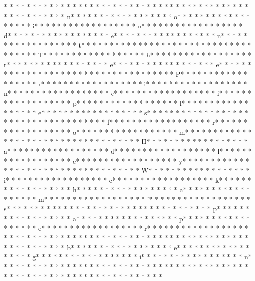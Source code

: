 * * *  * * *  * * *  *  * * *  *  * * *  * 	* * *  * * *  * * *  *  * * *  *  * * *  * 	* * *  * * *  * * *  *  * * *  *  * * *  * n* * *  * * *  * * *  *  * * *  *  * * *  * o* * *  * * *  * * *  *  * * *  *  * * *  * i* * *  * * *  * * *  *  * * *  *  * * *  * n* * *  * * *  * * *  *  * * *  *  * * *  * d* * *  * * *  * * *  *  * * *  *  * * *  * e* * *  * * *  * * *  *  * * *  *  * * *  * n* * *  * * *  * * *  *  * * *  *  * * *  * t* * *  * * *  * * *  *  * * *  *  * * *  *  * * *  * * *  * * *  *  * * *  *  * * *  * T* * *  * * *  * * *  *  * * *  *  * * *  * h* * *  * * *  * * *  *  * * *  *  * * *  * r* * *  * * *  * * *  *  * * *  *  * * *  * e* * *  * * *  * * *  *  * * *  *  * * *  * e* * *  * * *  * * *  *  * * *  *  * * *  *  * * *  * * *  * * *  *  * * *  *  * * *  * P* * *  * * *  * * *  *  * * *  *  * * *  * r* * *  * * *  * * *  *  * * *  *  * * *  * i* * *  * * *  * * *  *  * * *  *  * * *  * n* * *  * * *  * * *  *  * * *  *  * * *  * c* * *  * * *  * * *  *  * * *  *  * * *  * i* * *  * * *  * * *  *  * * *  *  * * *  * p* * *  * * *  * * *  *  * * *  *  * * *  * l* * *  * * *  * * *  *  * * *  *  * * *  * e* * *  * * *  * * *  *  * * *  *  * * *  * s* * *  * * *  * * *  *  * * *  *  * * *  *  * * *  * * *  * * *  *  * * *  *  * * *  * f* * *  * * *  * * *  *  * * *  *  * * *  * r* * *  * * *  * * *  *  * * *  *  * * *  * o* * *  * * *  * * *  *  * * *  *  * * *  * m* * *  * * *  * * *  *  * * *  *  * * *  *  * * *  * * *  * * *  *  * * *  *  * * *  * H* * *  * * *  * * *  *  * * *  *  * * *  * a* * *  * * *  * * *  *  * * *  *  * * *  * d* * *  * * *  * * *  *  * * *  *  * * *  * l* * *  * * *  * * *  *  * * *  *  * * *  * e* * *  * * *  * * *  *  * * *  *  * * *  * y* * *  * * *  * * *  *  * * *  *  * * *  *  * * *  * * *  * * *  *  * * *  *  * * *  * W* * *  * * *  * * *  *  * * *  *  * * *  * i* * *  * * *  * * *  *  * * *  *  * * *  * c* * *  * * *  * * *  *  * * *  *  * * *  * k* * *  * * *  * * *  *  * * *  *  * * *  * h* * *  * * *  * * *  *  * * *  *  * * *  * a* * *  * * *  * * *  *  * * *  *  * * *  * m* * *  * * *  * * *  *  * * *  *  * * *  * '* * *  * * *  * * *  *  * * *  *  * * *  * s* * *  * * *  * * *  *  * * *  *  * * *  *  * * *  * * *  * * *  *  * * *  *  * * *  * p* * *  * * *  * * *  *  * * *  *  * * *  * a* * *  * * *  * * *  *  * * *  *  * * *  * p* * *  * * *  * * *  *  * * *  *  * * *  * e* * *  * * *  * * *  *  * * *  *  * * *  * r* * *  * * *  * * *  *  * * *  *  * * *  * 
* * *  * * *  * * *  *  * * *  *  * * *  * 	* * *  * * *  * * *  *  * * *  *  * * *  * 	* * *  * * *  * * *  *  * * *  *  * * *  * b* * *  * * *  * * *  *  * * *  *  * * *  * e* * *  * * *  * * *  *  * * *  *  * * *  * g* * *  * * *  * * *  *  * * *  *  * * *  * i* * *  * * *  * * *  *  * * *  *  * * *  * n* * *  * * *  * * *  *  * * *  *  * * *  * {* * *  * * *  * * *  *  * * *  *  * * *  *  * * *  * * *  * * *  *  * * *  *  * * *  * }* * *  * * *  * * *  *  * * *  *  * * *  * 

